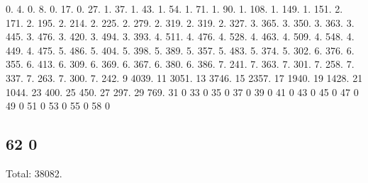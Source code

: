 0. 4. 0. 8. 0. 17. 0. 27. 1. 37. 1. 43. 1. 54. 1. 71. 1. 90. 1. 108. 1. 149. 1. 151. 2. 171. 2. 195. 2. 214. 2. 225. 2. 279. 2. 319. 2. 319. 2. 327. 3. 365. 3. 350. 3. 363. 3. 445. 3. 476. 3. 420. 3. 494. 3. 393. 4. 511. 4. 476. 4. 528. 4. 463. 4. 509. 4. 548. 4. 449. 4. 475. 5. 486. 5. 404. 5. 398. 5. 389. 5. 357. 5. 483. 5. 374. 5. 302. 6. 376. 6. 355. 6. 413. 6. 309. 6. 369. 6. 367. 6. 380. 6. 386. 7. 241. 7. 363. 7. 301. 7. 258. 7. 337. 7. 263. 7. 300. 7. 242. 9 4039. 11 3051. 13 3746. 15 2357. 17 1940. 19 1428. 21 1044. 23 400. 25 450. 27 297. 29 769. 31 0 33 0 35 0 37 0 39 0 41 0 43 0 45 0 47 0 49 0 51 0 53 0 55 0 58 0 \subsection*{62 0 }

Total\+: 38082. 